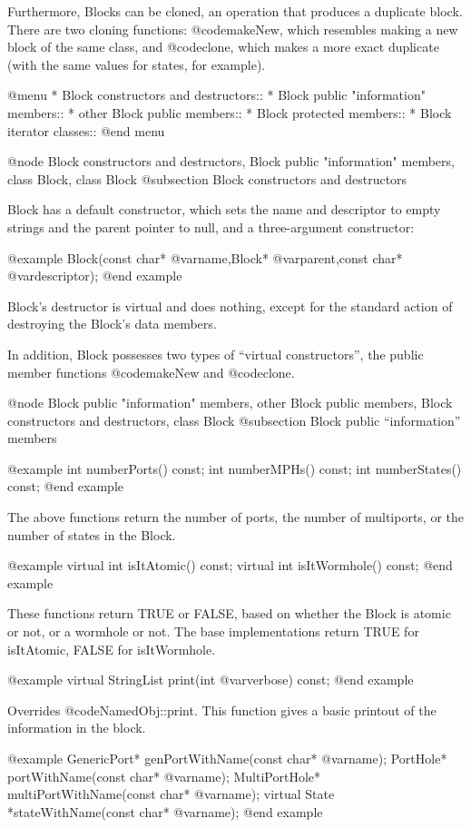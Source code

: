 Furthermore, Blocks can be cloned, an operation that produces a
duplicate block.  There are two cloning functions: @code{makeNew},
which resembles making a new block of the same class, and @code{clone},
which makes a more exact duplicate (with the same values for states,
for example).

@menu
* Block constructors and destructors::  
* Block public "information" members::  
* other Block public members::  
* Block protected members::     
* Block iterator classes::      
@end menu

@node Block constructors and destructors, Block public "information" members, class Block, class Block
@subsection Block constructors and destructors

Block has a default constructor, which sets the name and
descriptor to empty strings and the parent pointer to null, and a
three-argument constructor:

@example
Block(const char* @var{name},Block* @var{parent},const char* @var{descriptor});
@end example

Block's destructor is virtual and does nothing, except for the standard
action of destroying the Block's data members.

In addition, Block possesses two types of ``virtual constructors'', the
public member functions @code{makeNew} and @code{clone}.

@node Block public "information" members, other Block public members, Block constructors and destructors, class Block
@subsection Block public ``information'' members

@example
int numberPorts() const;
int numberMPHs() const;
int numberStates() const;
@end example

The above functions return the number of ports, the number of
multiports, or the number of states in the Block.

@example
virtual int isItAtomic() const;
virtual int isItWormhole() const;
@end example

These functions return TRUE or FALSE, based on whether the Block is
atomic or not, or a wormhole or not.  The base implementations return
TRUE for isItAtomic, FALSE for isItWormhole.

@example
virtual StringList print(int @var{verbose}) const;
@end example

Overrides @code{NamedObj::print}.  This function gives a basic printout of
the information in the block.

@example
GenericPort* genPortWithName(const char* @var{name});
PortHole* portWithName(const char* @var{name});
MultiPortHole* multiPortWithName(const char* @var{name});
virtual State *stateWithName(const char* @var{name});
@end example

